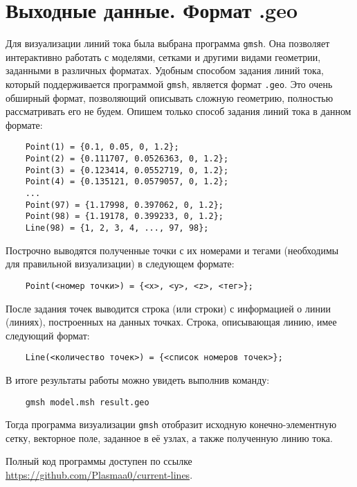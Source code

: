 \section{Выходные данные. Формат .geo}\label{geo_format}
Для визуализации линий тока была выбрана программа \verb|gmsh|. Она позволяет интерактивно работать с моделями, сетками и другими видами геометрии, заданными в различных форматах. Удобным способом задания линий тока, который поддерживается программой \verb|gmsh|, является формат \verb|.geo|. Это очень обширный формат, позволяющий описывать сложную геометрию, полностью рассматривать его не будем. Опишем только способ задания линий тока в данном формате:
\begin{verbatim}
	Point(1) = {0.1, 0.05, 0, 1.2};
	Point(2) = {0.111707, 0.0526363, 0, 1.2};
	Point(3) = {0.123414, 0.0552719, 0, 1.2};
	Point(4) = {0.135121, 0.0579057, 0, 1.2};
	...
	Point(97) = {1.17998, 0.397062, 0, 1.2};
	Point(98) = {1.19178, 0.399233, 0, 1.2};
	Line(98) = {1, 2, 3, 4, ..., 97, 98};
\end{verbatim}
Построчно выводятся полученные точки с их номерами и тегами (необходимы для правильной визуализации) в следующем формате:
\begin{verbatim}
	Point(<номер точки>) = {<x>, <y>, <z>, <тег>};
\end{verbatim}
После задания точек выводится строка (или строки) с информацией о линии (линиях), построенных на данных точках. Строка, описывающая линию, имее следующий формат:
\begin{verbatim}
	Line(<количество точек>) = {<список номеров точек>};
\end{verbatim}

В итоге результаты работы можно увидеть выполнив команду:
\begin{verbatim}
	gmsh model.msh result.geo
\end{verbatim}
Тогда программа визуализации \verb|gmsh| отобразит исходную конечно-элементную сетку, векторное поле, заданное в её узлах, а также полученную линию тока.

Полный код программы доступен по ссылке \url{https://github.com/Plasmaa0/current-lines}.